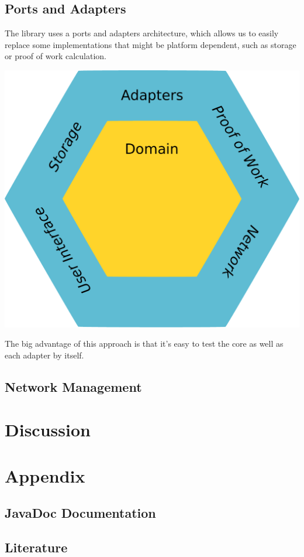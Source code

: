 \documentclass{bfh}
\begin{document}
  \subsection{Ports and Adapters}

  The library uses a ports and adapters architecture, which allows us to easily replace some implementations that might be platform dependent, such as storage or proof of work calculation.

  \includegraphics[width=\textwidth]{images/ports_and_adapters.pdf}

  The big advantage of this approach is that it's easy to test the core as well as each adapter by itself.


  \subsection{Network Management}


  \section{Discussion}


  \appendix
  \section*{Appendix}
  \renewcommand{\thesubsection}{\Alph{subsection}}


  \subsection{JavaDoc Documentation}


  \subsection{Literature}
\end{document}
